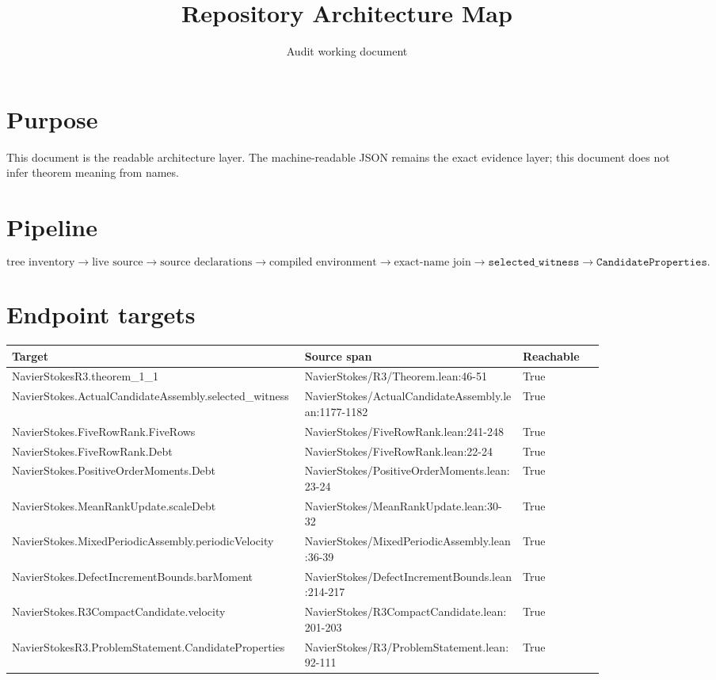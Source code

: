 \documentclass[10pt]{article}
\title{Repository Architecture Map}
\author{Audit working document}
\begin{document}
\maketitle
\section*{Purpose}
This document is the readable architecture layer. The machine-readable JSON remains the exact evidence layer; this document does not infer theorem meaning from names.
\section*{Pipeline}
\[\text{tree inventory}\to\text{live source}\to\text{source declarations}\to\text{compiled environment}\to\text{exact-name join}\to\texttt{selected\_witness}\to\texttt{CandidateProperties}.\]
\section*{Endpoint targets}
\begin{longtable}{p{0.43\linewidth}p{0.32\linewidth}p{0.12\linewidth}}\toprule Target & Source span & Reachable\\\midrule
NavierStokesR3.theorem\_1\_1 & NavierStokes/R3/Theorem.lean:46-51 & True\\
NavierStokes.ActualCandidateAssembly.selected\_witness & NavierStokes/ActualCandidateAssembly.lean:1177-1182 & True\\
NavierStokes.FiveRowRank.FiveRows & NavierStokes/FiveRowRank.lean:241-248 & True\\
NavierStokes.FiveRowRank.Debt & NavierStokes/FiveRowRank.lean:22-24 & True\\
NavierStokes.PositiveOrderMoments.Debt & NavierStokes/PositiveOrderMoments.lean:23-24 & True\\
NavierStokes.MeanRankUpdate.scaleDebt & NavierStokes/MeanRankUpdate.lean:30-32 & True\\
NavierStokes.MixedPeriodicAssembly.periodicVelocity & NavierStokes/MixedPeriodicAssembly.lean:36-39 & True\\
NavierStokes.DefectIncrementBounds.barMoment & NavierStokes/DefectIncrementBounds.lean:214-217 & True\\
NavierStokes.R3CompactCandidate.velocity & NavierStokes/R3CompactCandidate.lean:201-203 & True\\
NavierStokesR3.ProblemStatement.CandidateProperties & NavierStokes/R3/ProblemStatement.lean:92-111 & True\\
\bottomrule\end{longtable}
\end{document}
